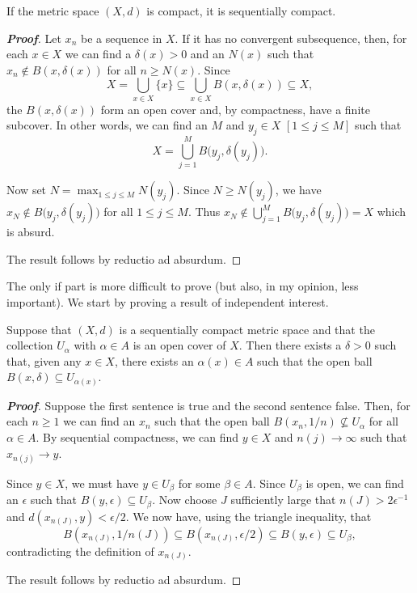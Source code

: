 \begin{theorem}\label{T;compact implies sequence}
If the metric space $(X,d)$ is compact, it is sequentially compact.
\end{theorem}
\begin{proof}[\bf Proof] Let $x_{n}$ be a sequence in $X$. If it has no convergent subsequence, then, for each $x\in X$ we can find a $\delta(x)>0$ and an $N(x)$ such that $x_{n}\notin B(x,\delta(x))$ for all $n\geq N(x)$. Since
\[X=\bigcup_{x\in X}\{x\} \subseteq\bigcup_{x\in X}B(x,\delta(x))\subseteq X,\]
the $B(x,\delta(x))$ form an open cover and, by compactness,
have a finite subcover. In other words, we can find
an $M$ and $y_{j}\in X$ $[1\leq j\leq M]$ such that
\[X=\bigcup_{j=1}^{M}B\big(y_{j},\delta(y_{j})\big).\]

Now set $N=\max_{1\leq j\leq M}N(y_{j})$. Since
$N\geq N(y_{j})$, we have
$x_{N}\notin B\big(y_{j},\delta(y_{j})\big)$
for all $1\leq j\leq M$. Thus 
$x_{N}\notin\bigcup_{j=1}^{M}B\big(y_{j},\delta(y_{j})\big)
=X$ which is absurd.  

The result follows by reductio ad absurdum. 
\end{proof}


The only if part is more difficult to prove (but also, in my opinion, less important). We start by proving a result of independent interest.


\begin{lemma}\label{L;Lebesgue}
Suppose that $(X,d)$ is a sequentially compact
metric space and that the collection $U_{\alpha}$
with $\alpha\in A$ is an open cover of $X$.
Then there exists a $\delta>0$ such that, given any
$x\in X$, there exists an $\alpha(x)\in A$
such that the open ball $B(x,\delta)\subseteq U_{\alpha(x)}$.
\end{lemma}
\begin{proof}[\bf Proof] Suppose the first sentence is true and the
second sentence false. Then, for each $n\geq 1$
we can find an $x_{n}$ such that the open ball
$B(x_{n},1/n)\not\subseteq U_{\alpha}$
for all $\alpha\in A$. By sequential compactness,
we can find $y\in X$ and $n(j)\rightarrow\infty$
such that $x_{n(j)}\rightarrow y$.

Since $y\in X$, we must have $y\in U_{\beta}$ 
for some $\beta\in A$. Since $U_{\beta}$ is open,
we can find an $\epsilon$ such that 
$B(y,\epsilon)\subseteq U_{\beta}$.
Now choose $J$ sufficiently large that $n(J)>2\epsilon^{-1}$
and $d(x_{n(J)},y)<\epsilon/2$. We now have,
using the triangle inequality, that
\[B(x_{n(J)},1/n(J))\subseteq B(x_{n(J)},\epsilon/2)
\subseteq B(y,\epsilon)\subseteq U_{\beta},\]
contradicting the definition of $x_{n(J)}$.

The result follows by reductio ad absurdum.
\end{proof}

